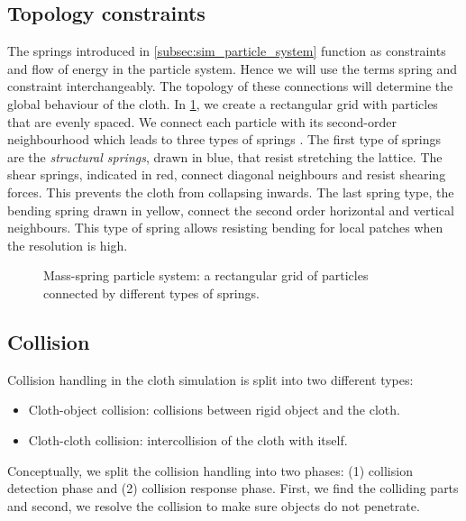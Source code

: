 \documentclass[\home/main.tex]{subfiles}
\begin{document}
\subsection{Topology constraints} \label{subsec:sim_topology_cloth}
The springs introduced in \cref{subsec:sim_particle_system} function as constraints and flow of energy in the particle system. Hence we will use the terms spring and constraint interchangeably. The topology of these connections will determine the global behaviour of the cloth. In \cref{fig:sim_topology_cloth_springs}, we create a rectangular grid with particles that are evenly spaced. We connect each particle with its second-order neighbourhood which leads to three types of springs \autocite{Provot1995DeformationCI}. The first type of springs are the \emph{structural springs}, drawn in blue, that resist stretching the lattice.
The shear springs, indicated in red, connect diagonal neighbours and resist shearing forces. This prevents the cloth from collapsing inwards.
The last spring type, the bending spring drawn in yellow, connect the second order horizontal and vertical neighbours. This type of spring allows resisting bending for local patches when the resolution is high.

\begin{figure}[htb]
    \centering
    
    \caption[Mass-spring particle system.]{Mass-spring particle system: a rectangular grid of particles connected by different types of springs.}
    \label{fig:sim_topology_cloth_springs}
\end{figure}

\subsection{Collision}
Collision handling in the cloth simulation is split into two different types:
\begin{itemize}
    \item Cloth-object collision: collisions between rigid object and the cloth.
    \item Cloth-cloth collision: intercollision of the cloth with itself.
\end{itemize}

Conceptually, we split the collision handling into two phases: (1) collision detection phase and (2) collision response phase. First, we find the colliding parts and second, we resolve the collision to make sure objects do not penetrate.
\end{document}

